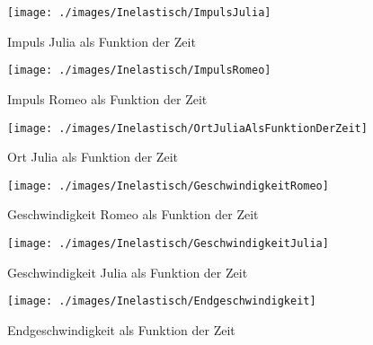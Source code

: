 \documentclass[../main.tex]{subfiles}
\begin{document}
    \begin{figure}[H]
        \begin{center}
            \centerline{\texttt{[image: ./images/Inelastisch/ImpulsJulia]}}
            \caption{Impuls Julia als Funktion der Zeit}
            \label{fig:ImpulsJulia}
        \end{center}
    \end{figure}

    \begin{figure}[H]
        \begin{center}
            \centerline{\texttt{[image: ./images/Inelastisch/ImpulsRomeo]}}
            \caption{Impuls Romeo als Funktion der Zeit}
            \label{fig:ImpulsRomeo}
        \end{center}
    \end{figure}

    \begin{figure}[H]
        \begin{center}
            \centerline{\texttt{[image: ./images/Inelastisch/OrtJuliaAlsFunktionDerZeit]}}
            \caption{Ort Julia als Funktion der Zeit}
            \label{fig:OrtJuliaAlsFunktionDerZeit}
        \end{center}
    \end{figure}

    \begin{figure}[H]
        \begin{center}
            \centerline{\texttt{[image: ./images/Inelastisch/GeschwindigkeitRomeo]}}
            \caption{Geschwindigkeit Romeo als Funktion der Zeit}
            \label{fig:GeschwindigkeitRomeo}
        \end{center}
    \end{figure}

    \begin{figure}[H]
        \begin{center}
            \centerline{\texttt{[image: ./images/Inelastisch/GeschwindigkeitJulia]}}
            \caption{Geschwindigkeit Julia als Funktion der Zeit}
            \label{fig:GeschwindigkeitJulia}
        \end{center}
    \end{figure}



    \begin{figure}[H]
        \begin{center}
            \centerline{\texttt{[image: ./images/Inelastisch/Endgeschwindigkeit]}}
            \caption{Endgeschwindigkeit als Funktion der Zeit}
            \label{fig:Endgeschwindigkeit}
        \end{center}
    \end{figure}
\end{document}

